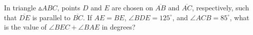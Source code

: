 In triangle $\vartriangle ABC$, points $D$ and $E$ are chosen on $\overline{AB}$ and $\overline{AC}$, respectively, such that $\overline{DE}$ is parallel to $\overline{BC}$. If $AE = BE$, $\angle BDE = 125^\circ$, and $\angle ACB = 85^\circ$, what is the value of $\angle BEC + \angle BAE$ in degrees?
